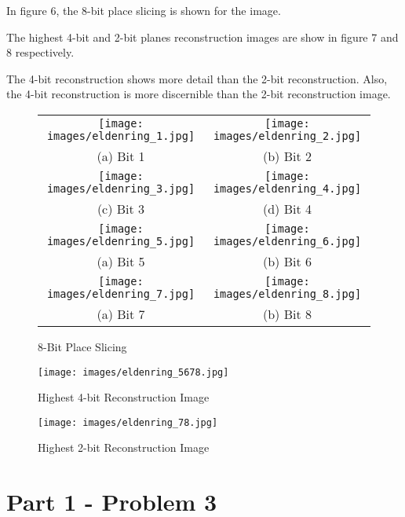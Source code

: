 \documentclass[conference]{IEEEtran}
\begin{document}
In figure 6, the 8-bit place slicing is shown for the image.

The highest 4-bit and 2-bit planes reconstruction images are show in figure 7 and 8 respectively.

The 4-bit reconstruction shows more detail than the 2-bit reconstruction. Also, the 4-bit reconstruction is more discernible than the 2-bit reconstruction image.

\begin{figure}
    \begin{tabular}{cc}
        \texttt{[image: images/eldenring\_1.jpg]} & \texttt{[image: images/eldenring\_2.jpg]} \\  
        (a) Bit 1 & (b) Bit 2 \\[6pt]
        \texttt{[image: images/eldenring\_3.jpg]} & \texttt{[image: images/eldenring\_4.jpg]} \\
        (c) Bit 3 & (d) Bit 4 \\[6pt]
        \texttt{[image: images/eldenring\_5.jpg]} & \texttt{[image: images/eldenring\_6.jpg]} \\  
        (a) Bit 5 & (b) Bit 6 \\[6pt]
        \texttt{[image: images/eldenring\_7.jpg]} & \texttt{[image: images/eldenring\_8.jpg]} \\  
        (a) Bit 7 & (b) Bit 8 \\[6pt]
    \end{tabular}
    \caption{8-Bit Place Slicing}
\end{figure}

\begin{figure}[htbp]
    \centering
    \texttt{[image: images/eldenring\_5678.jpg]}
    \caption{Highest 4-bit Reconstruction Image}
    \centering
    \texttt{[image: images/eldenring\_78.jpg]}
    \caption{Highest 2-bit Reconstruction Image}
\end{figure}

\section*{Part 1 - Problem 3}
\end{document}
